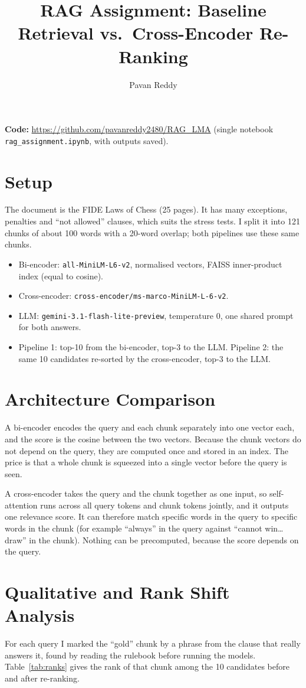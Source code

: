 \documentclass[11pt,a4paper]{article}
\title{RAG Assignment: Baseline Retrieval vs.\ Cross-Encoder Re-Ranking}
\author{Pavan Reddy}
\date{}
\begin{document}
\maketitle

\textbf{Code:} \url{https://github.com/pavanreddy2480/RAG_LMA} (single notebook \texttt{rag\_assignment.ipynb}, with outputs saved).

\section*{Setup}
The document is the FIDE Laws of Chess (25 pages). It has many exceptions, penalties and ``not allowed'' clauses, which suits the stress tests. I split it into 121 chunks of about 100 words with a 20-word overlap; both pipelines use these same chunks.
\begin{itemize}
  \item Bi-encoder: \texttt{all-MiniLM-L6-v2}, normalised vectors, FAISS inner-product index (equal to cosine).
  \item Cross-encoder: \texttt{cross-encoder/ms-marco-MiniLM-L-6-v2}.
  \item LLM: \texttt{gemini-3.1-flash-lite-preview}, temperature 0, one shared prompt for both answers.
  \item Pipeline 1: top-10 from the bi-encoder, top-3 to the LLM. Pipeline 2: the same 10 candidates re-sorted by the cross-encoder, top-3 to the LLM.
\end{itemize}

\section{Architecture Comparison}
A bi-encoder encodes the query and each chunk separately into one vector each, and the score is the cosine between the two vectors. Because the chunk vectors do not depend on the query, they are computed once and stored in an index. The price is that a whole chunk is squeezed into a single vector before the query is seen.

A cross-encoder takes the query and the chunk together as one input, so self-attention runs across all query tokens and chunk tokens jointly, and it outputs one relevance score. It can therefore match specific words in the query to specific words in the chunk (for example ``always'' in the query against ``cannot win\ldots draw'' in the chunk). Nothing can be precomputed, because the score depends on the query.

\section{Qualitative and Rank Shift Analysis}
For each query I marked the ``gold'' chunk by a phrase from the clause that really answers it, found by reading the rulebook before running the models. Table~\ref{tab:ranks} gives the rank of that chunk among the 10 candidates before and after re-ranking.
\end{document}
